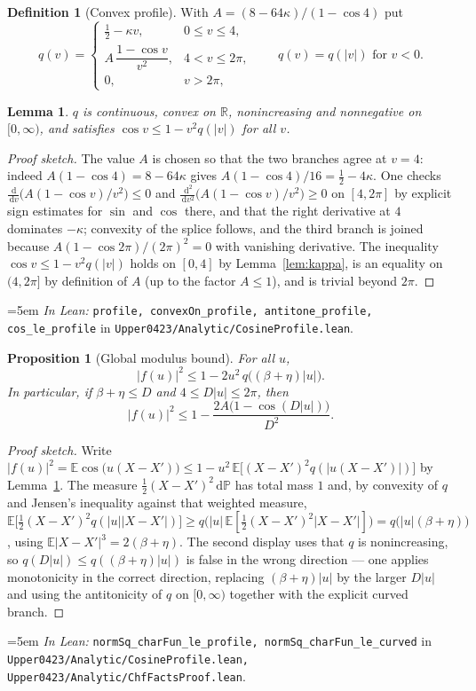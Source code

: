 \documentclass[11pt,a4paper]{article}
\newtheorem{proposition}[theorem]{Proposition}
\newtheorem{lemma}[theorem]{Lemma}
\theoremstyle{definition}
\newtheorem{definition}[theorem]{Definition}
\newcommand{\RR}{\mathbb{R}}
\newcommand{\EE}{\mathbb{E}}
\newcommand{\PP}{\mathbb{P}}
\newcommand{\dd}{\,\mathrm{d}}
\newcommand{\kap}{\kappa}
\newcommand{\Lean}[1]{\texttt{#1}}
\newcommand{\file}[1]{\texttt{#1}}
\newcommand{\formal}[2]{%
  \par\smallskip
  \begingroup\small\raggedright\emergencystretch=5em
  \noindent\textit{In Lean:} \Lean{#1} in \file{#2}.\par
  \endgroup\smallskip}
\begin{document}
\begin{definition}[Convex profile]
  \label{def:profile}
  With $A=(8-64\kap)/(1-\cos4)$ put
  \[
    q(v)=
    \begin{cases}
      \tfrac12-\kap v, & 0\le v\le 4,\\[2pt]
      A\,\dfrac{1-\cos v}{v^2}, & 4< v\le 2\pi,\\[6pt]
      0, & v>2\pi,
    \end{cases}
    \qquad q(v)=q(|v|) \text{ for } v<0 .
  \]
\end{definition}

\begin{lemma}
  \label{lem:profile}
  $q$ is continuous, convex on $\RR$, nonincreasing and nonnegative on
  $[0,\infty)$, and satisfies $\cos v\le 1-v^2q(|v|)$ for all $v$.
\end{lemma}

\begin{proof}[Proof sketch]
  The value $A$ is chosen so that the two branches agree at $v=4$: indeed
  $A(1-\cos4)=8-64\kap$ gives $A(1-\cos4)/16=\tfrac12-4\kap$. One checks
  $\tfrac{\dd}{\dd v}\bigl(A(1-\cos v)/v^2\bigr)\le0$ and
  $\tfrac{\dd^2}{\dd v^2}\bigl(A(1-\cos v)/v^2\bigr)\ge0$ on $[4,2\pi]$ by
  explicit sign estimates for $\sin$ and $\cos$ there, and that the right
  derivative at $4$ dominates $-\kap$; convexity of the splice follows, and the
  third branch is joined because $A(1-\cos2\pi)/(2\pi)^2=0$ with vanishing
  derivative. The inequality $\cos v\le1-v^2q(|v|)$ holds on $[0,4]$ by
  Lemma~\ref{lem:kappa}, is an equality on $(4,2\pi]$ by definition of $A$
  (up to the factor $A\le1$), and is trivial beyond $2\pi$.
\end{proof}
\formal{profile, convexOn\_profile, antitone\_profile, cos\_le\_profile}{Upper0423/Analytic/CosineProfile.lean}

\begin{proposition}[Global modulus bound]
  \label{prop:profilebound}
  For all $u$,
  \[
    |f(u)|^2\le1-2u^2\,q\bigl((\beta+\eta)|u|\bigr) .
  \]
  In particular, if $\beta+\eta\le D$ and $4\le D|u|\le2\pi$, then
  \[
    |f(u)|^2\le1-\frac{2A\bigl(1-\cos(D|u|)\bigr)}{D^2} .
  \]
\end{proposition}

\begin{proof}[Proof sketch]
  Write $|f(u)|^2=\EE\cos\bigl(u(X-X')\bigr)\le 1-u^2\,\EE\bigl[(X-X')^2
  q(|u(X-X')|)\bigr]$ by Lemma~\ref{lem:profile}. The measure
  $\tfrac12(X-X')^2\dd\PP$ has total mass $1$ and, by convexity of $q$ and
  Jensen's inequality against that weighted measure,
  $\EE\bigl[\tfrac12(X-X')^2q(|u||X-X'|)\bigr]\ge
  q\bigl(|u|\,\EE[\tfrac12(X-X')^2|X-X'|]\bigr)
  = q\bigl(|u|(\beta+\eta)\bigr)$, using
  $\EE|X-X'|^3=2(\beta+\eta)$. The second display uses that $q$ is
  nonincreasing, so $q(D|u|)\le q((\beta+\eta)|u|)$ is false in the wrong
  direction --- one applies monotonicity in the correct direction, replacing
  $(\beta+\eta)|u|$ by the larger $D|u|$ and using the antitonicity of $q$ on
  $[0,\infty)$ together with the explicit curved branch.
\end{proof}
\formal{normSq\_charFun\_le\_profile, normSq\_charFun\_le\_curved}{Upper0423/Analytic/CosineProfile.lean, Upper0423/Analytic/ChfFactsProof.lean}
\end{document}
